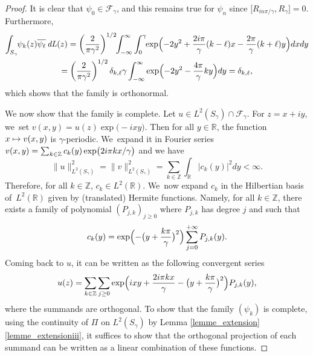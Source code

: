 \documentclass[10pt]{amsart}
\newcommand\mto{\mathchoice{\longmapsto}{\mapsto}{\mapsto}{\mapsto}}
\DeclareMathOperator{\dL}{\mathit{dL}}
\theoremstyle{definition}
\let\EE\exp
\let\dis\relax
\let\ov\overline
\newcommand\R{\mathbb R}
\newcommand\Z{\mathbb Z}
\begin{document}
\begin{proof} It is clear that $\psi_0 \in \mathcal{F}_\gamma$, and this remains true for $\psi_n$ since $\big[R_{{i n \pi}/\gamma},R_\gamma\big] = 0$. Furthermore,
\begin{multline*}
\int_{S_{\gamma}}\hspace*{-1mm} \psi_{k}(z)\ov{\psi_{\ell}} \dL(z) =\left(\frac{2}{\pi \gamma^2}\right)^{1/2}\hspace*{-1mm}
\int_{-\infty}^\infty \int_0^\gamma \hspace*{-1mm}\EE\Bigl(-2y^2+\frac{2i\pi}{\gamma}(k-\ell)x-\frac{2\pi}{\gamma}(k+\ell)y\Bigr) dx dy \\
= \left(\frac{2}{\pi \gamma^2}\right)^{1/2} \delta_{k,\ell} \gamma \int_{-\infty}^\infty \EE\Bigl(-2y^2-\frac{4\pi}{\gamma}ky\Bigr) dy = \delta_{k,\ell},
\end{multline*}
which shows that the family is orthonormal. 

We now show that the family is complete. Let $u \in L^2(S_\gamma) \cap \mathcal{F}_\gamma$. For $z=x+iy$, we~set $v(x,y)=u(z)\EE\bigl(-ixy\bigr)$. Then for all $y \in \R$, the function $x \mto v(x,y)$ is $\gamma$-periodic. We~expand it in Fourier series $\dis v(x,y)=\sum_{k \in \Z} c_k(y)\EE\bigl({{2i \pi k x}/\gamma}\bigr)$ and we have
\[
\|u \|^2_{L^2(S_\gamma)}=\|v\|^2_{L^2(S_\gamma)}=\sum_{k \in \Z} \int_{\R}|c_k(y)|^2 dy <\infty. 
\]
Therefore, for all $k \in \Z$, $c_k \in L^2(\R)$. We~now expand $c_k$ in the Hilbertian basis of~$L^2(\R)$ given by (translated) Hermite functions. Namely, for all $k\in \Z$, there exists a family of polynomial $(P_{j,k})_{j \geq 0}$ where $P_{j,k}$ has degree $j$ and such that
\[
c_k(y)=\EE\Bigl(-\bigl(y+\frac{k \pi}\gamma\bigr)^2\Bigr)\sum_{j=0}^{+\infty}P_{j,k}(y).
\]
Coming back to $u$, it can be written as the following convergent series
\[
u(z)=\sum_{k \in \Z} \sum_{j\geq 0} \EE\Bigl({ixy+\frac{2i \pi k x}\gamma -\bigl(y+\frac{k \pi}\gamma\bigr)^2} \Bigr) P_{j,k}(y),
\]
where the summands are orthogonal. To show that the family $(\psi_k)$ is complete, using the continuity of $\Pi$ on $L^2(S_\gamma)$ by Lemma \ref{lemme_extension}\eqref{lemme_extensioniii}, it suffices to show that the orthogonal projection of each summand can be written as a linear combination of these functions.


\end{proof}
\end{document}
